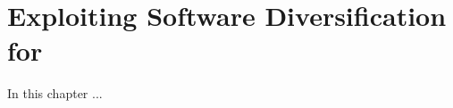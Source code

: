 \chapter{Exploiting Software Diversification for \Wasm}
\label{exploit}

In this chapter ... 






